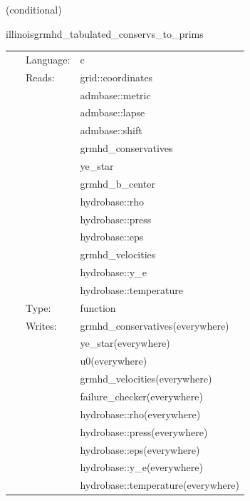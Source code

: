 \vspace{5mm}

   (conditional) 

\hspace{5mm} illinoisgrmhd\_tabulated\_conservs\_to\_prims 

\hspace{5mm}{\it tabulated version of illinoisgrmhd\_conservs\_to\_prims } 


\hspace{5mm}

 \begin{tabular*}{160mm}{cll} 
~ & Language:  & c \\ 
~ & Reads:  & grid::coordinates \\ 
~& ~ &admbase::metric\\ 
~& ~ &admbase::lapse\\ 
~& ~ &admbase::shift\\ 
~& ~ &grmhd\_conservatives\\ 
~& ~ &ye\_star\\ 
~& ~ &grmhd\_b\_center\\ 
~& ~ &hydrobase::rho\\ 
~& ~ &hydrobase::press\\ 
~& ~ &hydrobase::eps\\ 
~& ~ &grmhd\_velocities\\ 
~& ~ &hydrobase::y\_e\\ 
~& ~ &hydrobase::temperature\\ 
~ & Type:  & function \\ 
~ & Writes:  & grmhd\_conservatives(everywhere) \\ 
~& ~ &ye\_star(everywhere)\\ 
~& ~ &u0(everywhere)\\ 
~& ~ &grmhd\_velocities(everywhere)\\ 
~& ~ &failure\_checker(everywhere)\\ 
~& ~ &hydrobase::rho(everywhere)\\ 
~& ~ &hydrobase::press(everywhere)\\ 
~& ~ &hydrobase::eps(everywhere)\\ 
~& ~ &hydrobase::y\_e(everywhere)\\ 
~& ~ &hydrobase::temperature(everywhere)\\ 
\end{tabular*} 


\vspace{5mm}


